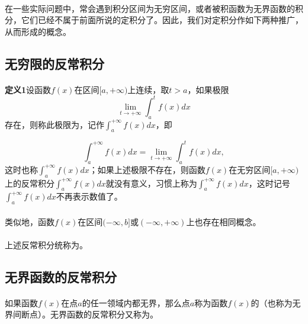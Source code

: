 \paragraph{}
在一些实际问题中，常会遇到积分区间为无穷区间，或者被积函数为无界函数的积分，它们已经不属于前面所说的定积分了。因此，我们对定积分作如下两种推广，从而形成的概念。

\subsection{无穷限的反常积分}
\paragraph{}
\textbf{定义1\;}设函数$f(x)$在区间$[a,+\infty)$上连续，取$t>a$，如果极限
\begin{equation}
  \lim_{t \to +\infty} \int_a^tf(x)dx
\end{equation}
存在，则称此极限为\uwave{函数{$f(x)$}在无穷区间{$[a,+\infty)$}上的反常积分}，记作$\displaystyle\int_a^{+\infty}f(x)dx$，即

\begin{equation}
  \int_a^{+\infty}f(x)dx = \lim_{t \to +\infty}\int_a^tf(x)dx,
\end{equation}
这时也称$\displaystyle\int_a^{+\infty}f(x)dx$；如果上述极限不存在，则函数$f(x)$在无穷区间$[a,+\infty)$上的反常积分$\displaystyle\int_a^{+\infty}f(x)dx$就没有意义，习惯上称为$\displaystyle\int_a^{+\infty}f(x)dx$，这时记号$\displaystyle\int_a^{+\infty}f(x)dx$不再表示数值了。

\paragraph{}
类似地，函数$f(x)$在区间$(-\infty,b]$或$(-\infty,+\infty)$上也存在相同概念。

\paragraph{}
上述反常积分统称为。

\subsection{无界函数的反常积分}
\paragraph{}
如果函数$f(x)$在点$a$的任一领域内都无界，那么点$a$称为函数$f(x)$的（也称为无界间断点）。无界函数的反常积分又称为。

